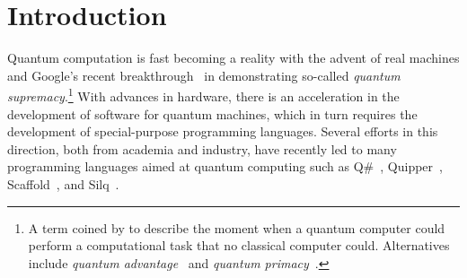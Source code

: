 
\title{\titlerunning}

\author{
\authorrunning
{}
}

\frenchspacing



\maketitle

\begin{abstract}
    As quantum computers become real, it is high time we come up with effective techniques that help programmers write correct quantum programs. Inspired by Hoare Type Theory in classical computing, we propose Quantum Hoare Type Theory (QHTT) in which precise specifications about the modification to the quantum state can be provided within the type of a computation. These specifications within a Hoare type are given in the form of Hoare-logic style pre- and postconditions following the propositions-as-types principle. The type-checking process verifies that the implementation conforms to the provided specification. QHTT has the potential to be a unified system for programming, specifying, and reasoning about quantum programs.
\end{abstract}

\thispagestyle{empty}

\tableofcontents

\listoftables

\listoffigures

\lstlistoflistings


\section{Introduction}

Quantum computation is fast becoming a reality with the advent of real machines and Google's recent breakthrough~\parencite{supremacy19} in demonstrating so-called \textit{quantum supremacy}.\footnote{A term coined by \textcite{Preskill2012} to describe the moment when a quantum computer could perform a computational task that no classical computer could. Alternatives include \textit{quantum advantage}~\parencite{nature-advantage2019} and \textit{quantum primacy}~\parencite{durham2021}.} With advances in hardware, there is an acceleration in the development of software for quantum machines, which in turn requires the development of special-purpose programming languages. Several efforts in this direction, both from academia and industry, have recently led to many programming languages aimed at quantum computing such as Q\#~\parencite{qsharp2018}, Quipper~\parencite{quipper2013}, Scaffold~\parencite{scaffold12}, and Silq~\parencite{silq20}.

